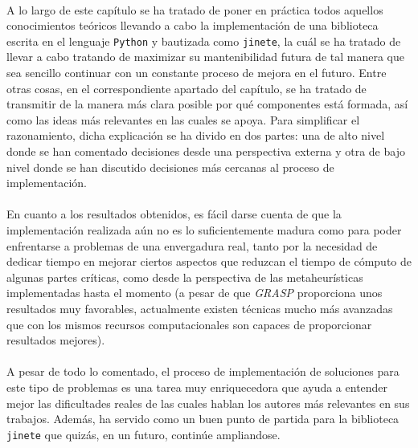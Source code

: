 \documentclass{subfiles}
\begin{document}
      \paragraph{}
      A lo largo de este capítulo se ha tratado de poner en práctica todos aquellos conocimientos teóricos llevando a cabo la implementación de una biblioteca escrita en el lenguaje \texttt{Python} y bautizada como \texttt{jinete}, la cuál se ha tratado de llevar a cabo tratando de maximizar su mantenibilidad futura de tal manera que sea sencillo continuar con un constante proceso de mejora en el futuro. Entre otras cosas, en el correspondiente apartado del capítulo, se ha tratado de transmitir de la manera más clara posible por qué componentes está formada, así como las ideas más relevantes en las cuales se apoya. Para simplificar el razonamiento, dicha explicación se ha divido en dos partes: una de alto nivel donde se han comentado decisiones desde una perspectiva externa y otra de bajo nivel donde se han discutido decisiones más cercanas al proceso de implementación.

      \paragraph{}
      En cuanto a los resultados obtenidos, es fácil darse cuenta de que la implementación realizada aún no es lo suficientemente madura como para poder enfrentarse a problemas de una envergadura real, tanto por la necesidad de dedicar tiempo en mejorar ciertos aspectos que reduzcan el tiempo de cómputo de algunas partes críticas, como desde la perspectiva de las metaheurísticas implementadas hasta el momento (a pesar de que \emph{GRASP} proporciona unos resultados muy favorables, actualmente existen técnicas mucho más avanzadas que con los mismos recursos computacionales son capaces de proporcionar resultados mejores).

      \paragraph{}
      A pesar de todo lo comentado, el proceso de implementación de soluciones para este tipo de problemas es una tarea muy enriquecedora que ayuda a entender mejor las dificultades reales de las cuales hablan los autores más relevantes en sus trabajos. Además, ha servido como un buen punto de partida para la biblioteca \texttt{jinete} que quizás, en un futuro, continúe ampliandose.
\end{document}
